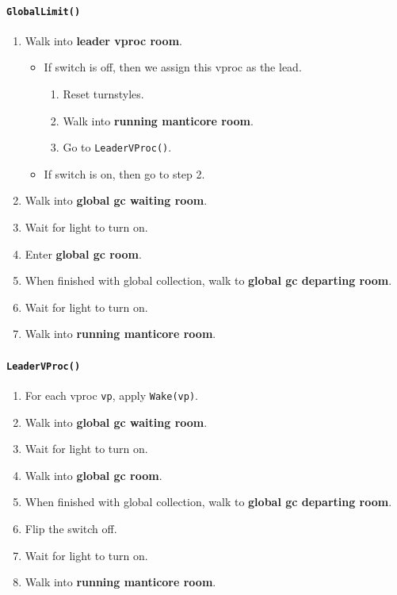 \documentclass[11pt]{article}
\begin{document}
\paragraph{\texttt{GlobalLimit()}}

\begin{enumerate}
  \item Walk into \textbf{leader vproc room}.
    \begin{itemize}
      \item If switch is off, then we assign this vproc as the lead.
        \begin{enumerate}
          \item Reset turnstyles.
          \item Walk into \textbf{running manticore room}.
          \item Go to \texttt{LeaderVProc()}.
        \end{enumerate}
      \item If switch is on, then go to step 2.
    \end{itemize}
  \item Walk into \textbf{global gc waiting room}.
  \item Wait for light to turn on.
  \item Enter \textbf{global gc room}.
  \item When finished with global collection, walk to \textbf{global gc departing room}.
  \item Wait for light to turn on.
  \item Walk into \textbf{running manticore room}.
\end{enumerate}

\paragraph{\texttt{LeaderVProc()}}

\begin{enumerate}
  \item For each vproc \texttt{vp}, apply \texttt{Wake(vp)}.
  \item Walk into \textbf{global gc waiting room}.
  \item Wait for light to turn on.
  \item Walk into \textbf{global gc room}.
  \item When finished with global collection, walk to \textbf{global gc departing room}.
  \item Flip the switch off.
  \item Wait for light to turn on.
  \item Walk into \textbf{running manticore room}.
\end{enumerate}
\end{document}
